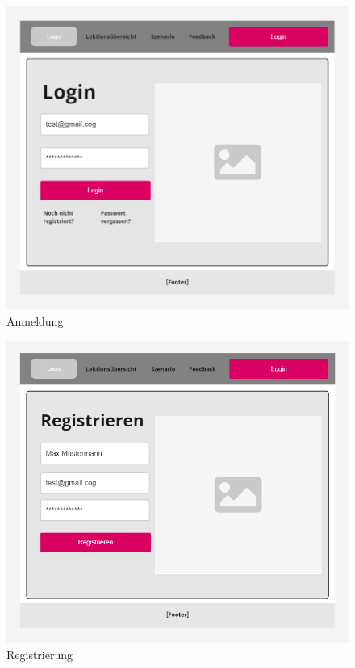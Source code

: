 \begin{figure}[H]
    \centering
    \includegraphics[width=1.0\textwidth]{assets/screenshots/mockups/LogIn-MockUp.png}
    \caption{Anmeldung}
    \label{fig:Anmeldung Mock-Up}
\end{figure}

\begin{figure}[H]
    \centering
    \includegraphics[width=1.0\textwidth]{assets/screenshots/mockups/Register-MockUp.png}
    \caption{Registrierung}
    \label{fig:Registrierung Mock-Up}
\end{figure}


